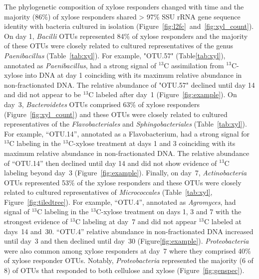 The phylogenetic composition of xylose responders changed with time and the
majority (86\%) of xylose responders shared > 97\% SSU rRNA gene sequence
identity with bacteria cultured in isolation
(Figure~\ref{fig:l2fc}~and~\ref{fig:xyl_count}). On day 1, \textit{Bacilli}
OTUs represented 84\% of xylose responders and the majority of these OTUs were
closely related to cultured representatives of the genus \textit{Paenibacillus}
(Table~\ref{tab:xyl}). For example, "OTU.57" (Table\ref{tab:xyl}),
annotated as \textit{Paenibacillus}, had a strong signal of $^{13}$C
assimilation from $^{13}$C-xylose into DNA at day 1 coinciding with its maximum
relative abundance in non-fractionated DNA. The relative abundance of "OTU.57"
declined until day 14 and did not appear to be $^{13}$C labeled after day~1
(Figure~\ref{fig:example}). On day~3, \textit{Bacteroidetes} OTUs comprised
63\% of xylose responders (Figure~\ref{fig:xyl_count}) and these OTUs were
closely related to cultured representatives of the \textit{Flavobacteriales}
and \textit{Sphingobacteriales} (Table~\ref{tab:xyl}). For example, ``OTU.14'',
annotated as a Flavobacterium, had a strong signal for $^{13}$C labeling in the
$^{13}$C-xylose treatment at days 1 and 3 coinciding with its maximum relative
abundance in non-fractionated DNA. The relative abundance of ``OTU.14'' then
declined until day 14 and did not show evidence of $^{13}$C labeling beyond
day~3 (Figure~\ref{fig:example}). Finally, on day~7, \textit{Actinobacteria}
OTUs represented 53\% of the xylose responders and these OTUs were closely
related to cultured representatives of \textit{Micrococcales}
(Table~\ref{tab:xyl}, Figure~\ref{fig:tiledtree}). For example, ``OTU.4'',
annotated as \textit{Agromyces}, had signal of $^{13}$C labeling in the
$^{13}$C-xylose treatment on days 1,
3 and 7 with the strongest evidence of $^{13}$C labeling at day~7 and did not
appear $^{13}$C labeled at days~14 and~30. ``OTU.4'' relative abundance in
non-fractionated DNA increased until day~3 and then declined until
day~30 (Figure\ref{fig:example}). \textit{Proteobacteria} were also common
among xylose responders at day~7 where they comprised 40\% of xylose responder
OTUs. Notably, \textit{Proteobacteria} represented the majority (6 of 8) of
OTUs that responded to both cellulose and xylose (Figure~\ref{fig:genspec}). 

